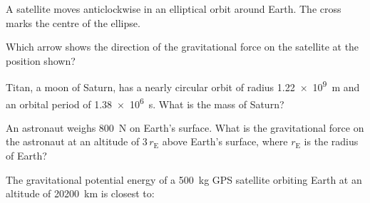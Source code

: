 \begin{quizq}{}
A satellite moves anticlockwise in an elliptical orbit around Earth. The cross marks the centre of
the ellipse.
\begin{center}
\end{center}
Which arrow shows the direction of the gravitational force on the satellite at the position shown?
\end{quizq}

\begin{quizq}{}
Titan, a moon of Saturn, has a nearly circular orbit of radius \qty{1.22e9}{m} and an orbital period
of \qty{1.38e6}{s}. What is the mass of Saturn?
\end{quizq}

\begin{quizq}{}
An astronaut weighs \qty{800}{N} on Earth's surface. What is the gravitational force on the astronaut
at an altitude of $3\,r_\mathrm{E}$ above Earth's surface, where $r_\mathrm{E}$ is the radius of Earth?
\end{quizq}

\begin{quizq}{}
The gravitational potential energy of a \qty{500}{kg} GPS satellite orbiting Earth at an altitude of
\qty{20200}{km} is closest to:
\end{quizq}


